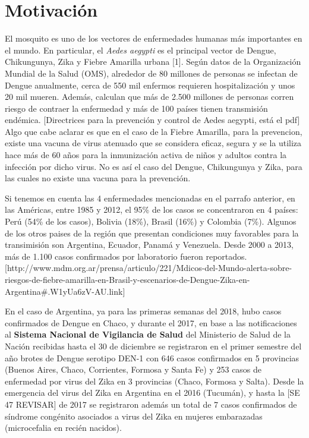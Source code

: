 



\chapter{Motivación}

\par El mosquito es uno de los vectores de enfermedades humanas más importantes
en el mundo. En particular, el \textit{Aedes aegypti} es el principal vector
de Dengue, Chikungunya, Zika y Fiebre Amarilla urbana [1].
Según datos de la Organización Mundial de la Salud (OMS), alrededor de 80 millones de
personas se infectan de Dengue anualmente, cerca de 550 mil enfermos requieren hospitalización y
unos 20 mil mueren. Además, calculan que más de 2.500 millones de personas corren
riesgo de contraer la enfermedad y más de 100 países tienen transmisión endémica.
[Directrices para la prevención y control de Aedes aegypti, está el pdf]
Algo que cabe aclarar es que en el caso de la Fiebre Amarilla, para la
prevencion, existe una vacuna de virus atenuado que se considera eficaz, segura
y se la utiliza hace más de 60 años para la inmunización activa de niños y
adultos contra la infección por dicho virus. No es así el caso del Dengue,
Chikungunya y Zika, para las cuales no existe una vacuna para la prevención.

\par Si tenemos en cuenta las 4 enfermedades mencionadas en el parrafo anterior,
en las Américas, entre 1985 y 2012, el 95\% de los casos se concentraron en
4 países: Perú (54\% de los casos), Bolivia (18\%), Brasil (16\%) y Colombia (7\%).
Algunos de los otros paises de la región que presentan condiciones muy
favorables para la transimisión son Argentina, Ecuador, Panamá y Venezuela.
Desde 2000 a 2013, más de 1.100 casos confirmados por laboratorio fueron
reportados.
[http://www.mdm.org.ar/prensa/articulo/221/Mdicos-del-Mundo-alerta-sobre-riesgos-de-fiebre-amarilla-en-Brasil-y-escenarios-de-Dengue-Zika-en-Argentina\#.W1yUa6zV-AU.link]

\par En el caso de Argentina, ya para las primeras semanas del 2018, hubo casos confirmados
de Dengue en Chaco, y durante el 2017, en base a las notificaciones al
\textbf{Sistema Nacional de Vigilancia de Salud} del Ministerio de Salud de la Nación
recibidas hasta el 30 de diciembre se registraron en el primer semestre del año brotes de
Dengue serotipo DEN-1 con 646 casos confirmados en 5 provincias
(Buenos Aires, Chaco, Corrientes, Formosa y Santa Fe) y 253 casos de enfermedad
por virus del Zika en 3 provincias (Chaco, Formosa y Salta).
Desde la emergencia del virus del Zika en Argentina en el 2016 (Tucumán), y hasta
la [SE 47 REVISAR] de 2017 se registraron además un total de 7 casos confirmados de
síndrome congénito asociados a virus del Zika en mujeres embarazadas
(microcefalia en recién nacidos).

